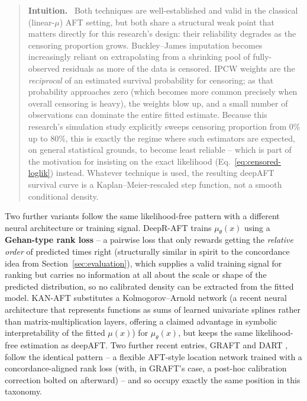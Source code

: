 \documentclass[11pt]{article}
\newenvironment{intuition}
  {\par\addvspace{8pt}\begin{quote}\noindent\textbf{\textcolor{blue!40!black}{Intuition.}}\ }
  {\end{quote}\par\addvspace{8pt}}
\begin{document}
\begin{intuition}
Both techniques are well-established and valid in the classical
(linear-$\mu$) AFT setting, but both share a structural weak point that
matters directly for this research's design: their reliability degrades
as the censoring proportion grows. Buckley--James imputation becomes
increasingly reliant on extrapolating from a shrinking pool of
fully-observed residuals as more of the data is censored. IPCW weights
are the \emph{reciprocal} of an estimated survival probability for
censoring; as that probability approaches zero (which becomes more
common precisely when overall censoring is heavy), the weights blow up,
and a small number of observations can dominate the entire fitted
estimate. Because this research's simulation study explicitly sweeps
censoring proportion from 0\% up to 80\%, this is exactly the regime
where such estimators are expected, on general statistical grounds, to
become least reliable -- which is part of the motivation for insisting
on the exact likelihood (Eq.~\eqref{eq:censored-loglik}) instead.
Whatever technique is used, the resulting deepAFT survival curve is a
Kaplan--Meier-rescaled step function, not a smooth conditional density.
\end{intuition}

Two further variants follow the same likelihood-free pattern with a
different neural architecture or training signal. DeepR-AFT
\citep{kim2022deepraft} trains $\mu_\theta(x)$ using a
\textbf{Gehan-type rank loss} -- a pairwise loss that only rewards
getting the \emph{relative order} of predicted times right (structurally
similar in spirit to the concordance idea from
Section~\ref{sec:evaluation}), which supplies a valid training signal for
ranking but carries no information at all about the scale or shape of
the predicted distribution, so no calibrated density can be extracted
from the fitted model. KAN-AFT \citep{francis2025kanaft} substitutes a
Kolmogorov--Arnold network (a recent neural architecture that
represents functions as sums of learned univariate splines rather than
matrix-multiplication layers, offering a claimed advantage in symbolic
interpretability of the fitted $\mu(x)$) for $\mu_\theta(x)$, but keeps
the same likelihood-free estimation as deepAFT. Two further recent
entries, GRAFT \citep{graft2026} and DART \citep{dart2023}, follow the
identical pattern -- a flexible AFT-style location network trained with a
concordance-aligned rank loss (with, in GRAFT's case, a post-hoc
calibration correction bolted on afterward) -- and so occupy exactly the
same position in this taxonomy.
\end{document}

